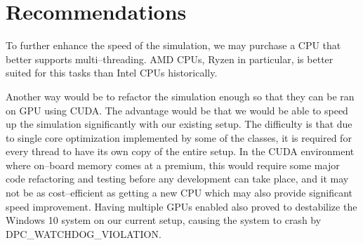 \chapter{Recommendations}
To further enhance the speed of the simulation, we may purchase a CPU that better supports multi--threading. AMD CPUs, Ryzen in particular, is better suited for this tasks than Intel CPUs historically.

Another way would be to refactor the simulation enough so that they can be ran on GPU using CUDA. The advantage would be that we would be able to speed up the simulation significantly with our existing setup. The difficulty is that due to single core optimization implemented by some of the classes, it is required for every thread to have its own copy of the entire setup. In the CUDA environment where on--board memory comes at a premium, this would require some major code refactoring and testing before any development can take place, and it may not be as cost--efficient as getting a new CPU which may also provide significant speed improvement. Having multiple GPUs enabled also proved to destabilize the Windows 10 system on our current setup, causing the system to crash by DPC\_WATCHDOG\_VIOLATION.